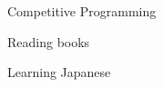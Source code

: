 

\begin{cventries}

  \cventryonlytitle
    {Competitive Programming}

  \cventryonlytitle
    {Reading books}

  \cventryonlytitle
    {Learning Japanese}

\end{cventries}
